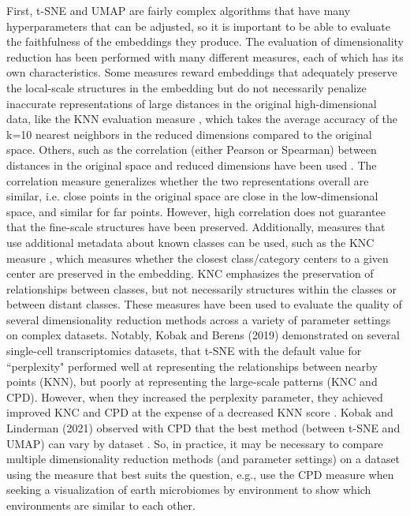First, t-SNE and UMAP are fairly complex algorithms that have many hyperparameters that can be adjusted, so it is important to be able to evaluate the faithfulness of the embeddings they produce. The evaluation of dimensionality reduction has been performed with many different measures, each of which has its own characteristics. Some measures reward embeddings that adequately preserve the local-scale structures in the embedding but do not necessarily penalize inaccurate representations of large distances in the original high-dimensional data, like the KNN evaluation measure \cite{Kobak2019-gk}, which takes the average accuracy of the k=10 nearest neighbors in the reduced dimensions compared to the original space. Others, such as the correlation (either Pearson or Spearman) between distances in the original space and reduced dimensions have been used \cite{Kobak2019-gk,Kobak2021-ih,Becht2019-hm}. The correlation measure generalizes whether the two representations overall are similar, i.e. close points in the original space are close in the low-dimensional space, and similar for far points. However, high correlation does not guarantee that the fine-scale structures have been preserved. Additionally, measures that use additional metadata about known classes can be used, such as the KNC measure \cite{Kobak2019-gk}, which measures whether the closest class/category centers to a given center are preserved in the embedding. KNC emphasizes the preservation of relationships between classes, but not necessarily structures within the classes or between distant classes. These measures have been used to evaluate the quality of several dimensionality reduction methods across a variety of parameter settings on complex datasets. Notably, Kobak and Berens (2019) demonstrated on several single-cell transcriptomics datasets, that t-SNE with the default value for ``perplexity" performed well at representing the relationships between nearby points (KNN), but poorly at representing the large-scale patterns (KNC and CPD). However, when they increased the perplexity parameter, they achieved improved KNC and CPD at the expense of a decreased KNN score \cite{Kobak2019-gk}. Kobak and Linderman (2021) observed with CPD that the best method (between t-SNE and UMAP) can vary by dataset \cite{Kobak2021-ih}. So, in practice, it may be necessary to compare multiple dimensionality reduction methods (and parameter settings) on a dataset using the measure that best suits the question, e.g., use the CPD measure when seeking a visualization of earth microbiomes by environment to show which environments are similar to each other.

